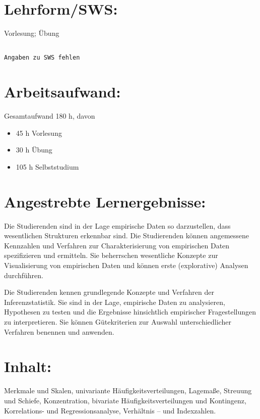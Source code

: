 \section*{Lehrform/SWS:}\label{lehrformsws-6}

Vorlesung; Übung

\begin{verbatim}

Angaben zu SWS fehlen
\end{verbatim}

\section*{Arbeitsaufwand:}\label{arbeitsaufwand-12}

Gesamtaufwand 180 h, davon

\begin{itemize}
\item
  45 h Vorlesung
\item
  30 h Übung
\item
  105 h Selbststudium
\end{itemize}

\section*{Angestrebte
Lernergebnisse:}\label{angestrebte-lernergebnisse-6}

Die Studierenden sind in der Lage empirische Daten so darzustellen, dass
wesentlichen Strukturen erkennbar sind. Die Studierenden können
angemessene Kennzahlen und Verfahren zur Charakterisierung von
empirischen Daten spezifizieren und ermitteln. Sie beherrschen
wesentliche Konzepte zur Visualisierung von empirischen Daten und können
erste (explorative) Analysen durchführen.

Die Studierenden kennen grundlegende Konzepte und Verfahren der
Inferenzstatistik. Sie sind in der Lage, empirische Daten zu
analysieren, Hypothesen zu testen und die Ergebnisse hinsichtlich
empirischer Fragestellungen zu interpretieren. Sie können Gütekriterien
zur Auswahl unterschiedlicher Verfahren benennen und anwenden.

\section*{Inhalt:}\label{inhalt-6}

Merkmale und Skalen, univariante Häufigkeitsverteilungen, Lagemaße,
Streuung und Schiefe, Konzentration, bivariate Häufigkeitsverteilungen
und Kontingenz, Korrelations- und Regressionsanalyse, Verhältnis -- und
Indexzahlen.

